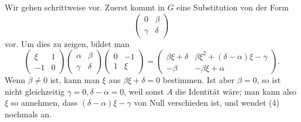 \documentclass[11pt]{article}
\begin{document}
Wir gehen schrittweise vor. Zuerst kommt in $G$ eine Substitution von der Form
\begin{equation}
 \begin{pmatrix}0&\beta\\ \gamma&\delta\end{pmatrix} \tag{3}
\end{equation}
vor. Um dies zu zeigen, bildet man
\begin{equation}
 \begin{pmatrix}\xi&1\\-1&0\end{pmatrix}
 \begin{pmatrix}\alpha&\beta\\\gamma&\delta\end{pmatrix}
 \begin{pmatrix}0&-1\\1&\xi\end{pmatrix}
 =
 \begin{pmatrix}
 \beta\xi+\delta&\beta\xi^2+(\delta-\alpha)\xi-\gamma\\
 -\beta&-\beta\xi+\alpha
 \end{pmatrix}. \tag{4}
\end{equation}
Wenn $\beta\ne0$ ist, kann man $\xi$ aus $\beta\xi+\delta=0$ bestimmen. Ist aber $\beta=0$, so ist nicht gleichzeitig $\gamma=0,\delta-\alpha=0$, weil sonst $A$ die Identität wäre; man kann also $\xi$ so annehmen, dass $(\delta-\alpha)\xi-\gamma$ von Null verschieden ist, und wendet (4) nochmals an.
\end{document}
